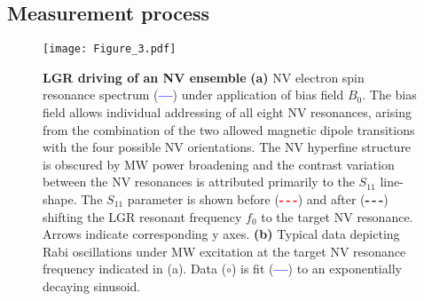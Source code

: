 \subsection{Measurement process} \label{measurement}

\begin{figure}[t!]
\centering
\texttt{[image: Figure\_3.pdf]}  
\caption{\textbf{LGR driving of an NV ensemble} \textbf{(a)} NV electron spin resonance spectrum (\textcolor{blue}{\textbf{---}}) under application of bias field $B_0$. The bias field allows individual addressing of all eight NV resonances, arising from the combination of the two allowed magnetic dipole transitions with the four possible NV orientations. The NV hyperfine structure is obscured by MW power broadening and the contrast variation between the NV resonances is attributed primarily to the $S_{11}$ line-shape. The $S_{11}$ parameter is shown before (\textcolor{red}{\textbf{-\,-\,-}}) and after (\textcolor{dolla-bill}{\textbf{-\,-\,-}}) shifting the LGR resonant frequency $f_0$ to the target NV resonance. Arrows indicate corresponding y axes. \textbf{(b)} Typical data depicting Rabi oscillations under MW excitation at the target NV resonance frequency indicated in (a). Data (\textcolor{navyblue}{$\mathbf{\circ}$}) is fit (\textcolor{blue}{\textbf{---}}) to an exponentially decaying sinusoid.}
\label{LGR_Rabi_meas}
\end{figure}

